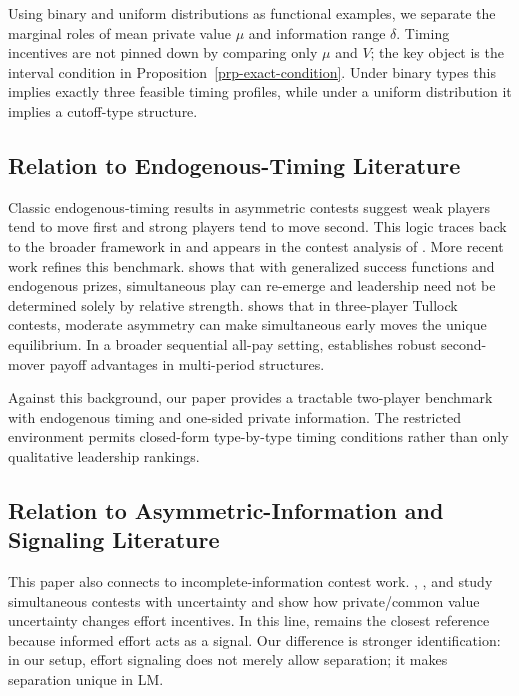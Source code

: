 \documentclass[
  english,
  a4paper,
  12pt]{article}
\theoremstyle{plain}
\theoremstyle{plain}
\theoremstyle{definition}
\theoremstyle{remark}
\begin{document}
Using binary and uniform distributions as functional examples, we
separate the marginal roles of mean private value \(\mu\) and
information range \(\delta\). Timing incentives are not pinned down by
comparing only \(\mu\) and \(V\); the key object is the interval
condition in Proposition~\ref{prp-exact-condition}. Under binary types
this implies exactly three feasible timing profiles, while under a
uniform distribution it implies a cutoff-type structure.

\subsection{Relation to Endogenous-Timing
Literature}\label{relation-to-endogenous-timing-literature}

Classic endogenous-timing results in asymmetric contests suggest weak
players tend to move first and strong players tend to move second. This
logic traces back to the broader framework in \citet{hamilton1990} and
appears in the contest analysis of \citet{fu2006}. More recent work
refines this benchmark. \citet{hoffmann2012} shows that with generalized
success functions and endogenous prizes, simultaneous play can re-emerge
and leadership need not be determined solely by relative strength.
\citet{baikleelee2022} shows that in three-player Tullock contests,
moderate asymmetry can make simultaneous early moves the unique
equilibrium. In a broader sequential all-pay setting,
\citet{dengfuwuzhu2021} establishes robust second-mover payoff
advantages in multi-period structures.

Against this background, our paper provides a tractable two-player
benchmark with endogenous timing and one-sided private information. The
restricted environment permits closed-form type-by-type timing
conditions rather than only qualitative leadership rankings.

\subsection{Relation to Asymmetric-Information and Signaling
Literature}\label{relation-to-asymmetric-information-and-signaling-literature}

This paper also connects to incomplete-information contest work.
\citet{hurley1998}, \citet{warneryd2003}, and \citet{warneryd2012} study
simultaneous contests with uncertainty and show how private/common value
uncertainty changes effort incentives. In this line, \citet{fu2006}
remains the closest reference because informed effort acts as a signal.
Our difference is stronger identification: in our setup, effort
signaling does not merely allow separation; it makes separation unique
in LM.
\end{document}
